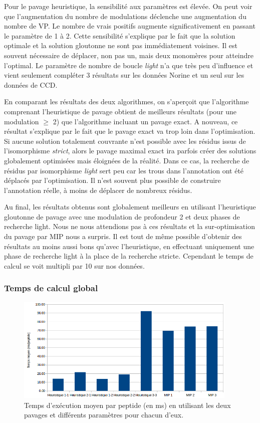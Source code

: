 Pour le pavage heuristique, la sensibilité aux paramètres est élevée.
On peut voir que l'augmentation du nombre de modulations déclenche une augmentation du nombre de VP.
Le nombre de vrais positifs augmente significativement en passant le paramètre de 1 à 2.
Cette sensibilité s'explique par le fait que la solution optimale et la solution gloutonne ne sont pas immédiatement voisines.
Il est souvent nécessaire de déplacer, non pas un, mais deux monomères pour atteindre l'optimal.
Le paramètre de nombre de boucle \textit{light} n'a que très peu d'influence et vient seulement compléter 3 résultats sur les données Norine et un seul sur les données de CCD.

En comparant les résultats des deux algorithmes, on s'aperçoit que l'algorithme comprenant l'heuristique de pavage obtient de meilleurs résultats (pour une modulation $\ge$ 2) que l'algorithme incluant un pavage exact.
A nouveau, ce résultat s'explique par le fait que le pavage exact va trop loin dans l'optimisation.
Si aucune solution totalement couvrante n'est possible avec les résidus issus de l'isomorphisme \textit{strict}, alors le pavage maximal exact ira parfois créer des solutions globalement optimisées mais éloignées de la réalité.
Dans ce cas, la recherche de résidus par isomorphisme \textit{light} sert peu car les trous dans l'annotation ont été déplacés par l'optimisation.
Il n'est souvent plus possible de construire l'annotation réelle, à moins de déplacer de nombreux résidus.

Au final, les résultats obtenus sont globalement meilleurs en utilisant l'heuristique gloutonne de pavage avec une modulation de profondeur 2 et deux phases de recherche light.
Nous ne nous attendions pas à ces résultats et la sur-optimisation du pavage par MIP nous a surpris.
Il est tout de même possible d'obtenir des résultats au moins aussi bons qu'avec l'heuristique, en effectuant uniquement une phase de recherche light à la place de la recherche stricte.
Cependant le temps de calcul se voit multipli par 10 sur nos données.


\subsubsection{Temps de calcul global}

\begin{figure}[!ht]
  \begin{center}
    \includegraphics[width=400px]{Figures/s2m/results/temps.png}
    \caption{\label{temps_general}Temps d'exécution moyen par peptide (en ms) en utilisant les deux pavages et différents paramètres pour chacun d'eux.}
  \end{center}
\end{figure}

